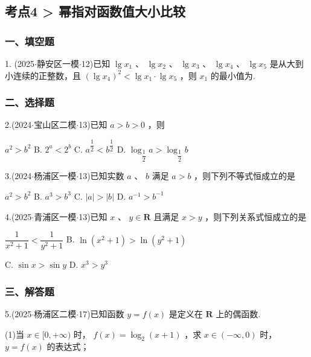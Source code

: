 \subsection*{考点4 > 幂指对函数值大小比较}

\subsubsection*{一、填空题}

1. (2025$\cdot$静安区一模$\cdot$12)已知 $\lg {x}_{1}$ 、 $\lg {x}_{2}$ 、 $\lg {x}_{3}$ 、 $\lg {x}_{4}$ 、 $\lg {x}_{5}$ 是从大到小连续的正整数，且 ${\left( \lg {x}_{4}\right) }^{2} <  \lg {x}_{1} \cdot  \lg {x}_{5}$ ，则 ${x}_{1}$ 的最小值为\blkda[2]{}.

\subsubsection*{二、选择题}

2.(2024$\cdot$宝山区二模$\cdot$13)已知 $a > b > 0$ ，则 \dotfill{(\kh{})}

\xx{}{}{}{}${a}^{2} > {b}^{2}$ B. ${2}^{a} < {2}^{b}$ C. ${a}^{\dfrac{1}{2}} < {b}^{\dfrac{1}{2}}$ D. ${\log }_{\dfrac{1}{2}}a > {\log }_{\dfrac{1}{2}}b$

3.(2024$\cdot$杨浦区一模$\cdot$13)已知实数 $a$ 、 $b$ 满足 $a > b$ ，则下列不等式恒成立的是 \dotfill{(\kh{})}

\xx{}{}{}{}${a}^{2} > {b}^{2}$ B. ${a}^{3} > {b}^{3}$ C. $\left| a\right|  > \left| b\right|$ D. ${a}^{-1} > {b}^{-1}$

4.(2025$\cdot$青浦区一模$\cdot$13)已知 $x$ 、 $y \in  \mathbf{R}$ 且满足 $x > y$ ，则下列关系式恒成立的是 \dotfill{(\kh{})}

\xx{}{}{}{}$\dfrac{1}{{x}^{2} + 1} < \dfrac{1}{{y}^{2} + 1}$ B. $\ln \left( {{x}^{2} + 1}\right)  > \ln \left( {{y}^{2} + 1}\right)$

C. $\sin x > \sin y$ D. ${x}^{3} > {y}^{3}$

\subsubsection*{三、解答题}

5.(2025$\cdot$杨浦区二模$\cdot$17)已知函数 $y = f\left( x\right)$ 是定义在 $\mathbf{R}$ 上的偶函数.

(1)当 $x \in  \lbrack 0, + \infty )$ 时， $f\left( x\right)  = {\log }_{2}\left( {x + 1}\right)$ ，求 $x \in  \left( {-\infty ,0}\right)$ 时， $y = f\left( x\right)$ 的表达式；


